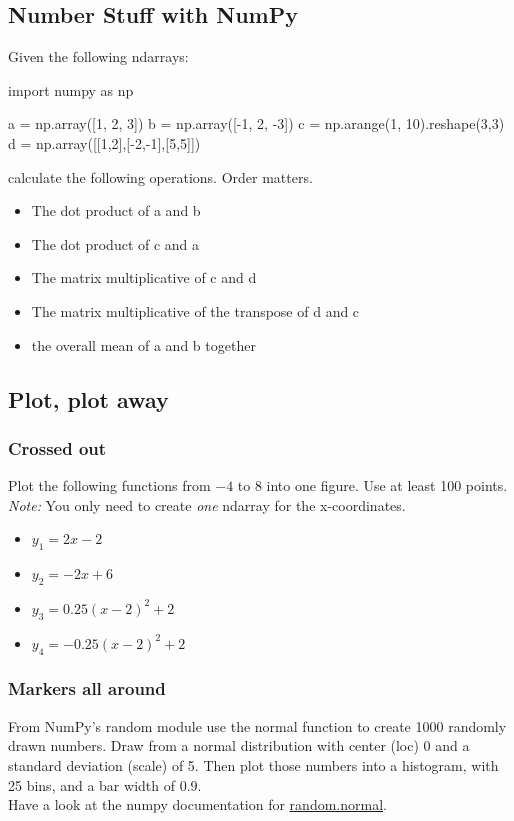 \subsection{Number Stuff with NumPy}
Given the following ndarrays:
\begin{python}
import numpy as np


a = np.array([1, 2, 3])
b = np.array([-1, 2, -3])
c = np.arange(1, 10).reshape(3,3)
d = np.array([[1,2],[-2,-1],[5,5]])
\end{python}
calculate the following operations. Order matters.
\begin{itemize}
	\item The dot product of a and b
	\item The dot product of c and a
	\item The matrix multiplicative of c and d
	\item The matrix multiplicative of the transpose of d and c
	\item the overall mean of a and b together
\end{itemize}


\subsection{Plot, plot away}
\subsubsection{Crossed out}
Plot the following functions from $-4$ to $8$ into one figure.
Use at least 100 points.\\
\emph{Note:} You only need to create \textit{one} ndarray for the x-coordinates.
\begin{itemize}
	\item $y_1 = 2x - 2$
	\item $y_2 = -2x + 6$
	\item $y_3 = 0.25(x - 2)^2 + 2$
	\item $y_4 = -0.25(x - 2)^2 + 2$
\end{itemize}

\subsubsection{Markers all around}
From NumPy's random module use the normal function to create 1000 randomly
drawn numbers. Draw from a normal distribution with center (loc) 0 and a
standard deviation (scale) of 5. Then plot those numbers into a histogram,
with 25 bins, and a bar width of 0.9.\\
Have a look at the numpy documentation for 
\href{https://docs.scipy.org/doc/numpy/reference/generated/numpy.random.normal.html#numpy.random.normal}{random.normal}.

